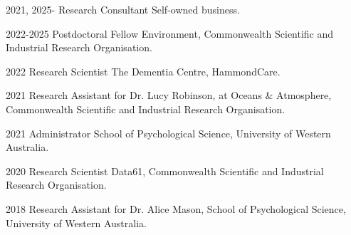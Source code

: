 

\begin{cvskills}

  \cvskill
    {2021, 2025-} %
    {Research Consultant} %
    {Self-owned business.} %

  \cvskill
    {2022-2025} %
    {Postdoctoral Fellow} %
    {Environment, Commonwealth Scientific and Industrial Research Organisation.} %

  \cvskill
    {2022} %
    {Research Scientist} %
    {The Dementia Centre, HammondCare.} %

  \cvskill
    {2021} %
    {Research Assistant} %
    {for Dr. Lucy Robinson, at Oceans \& Atmosphere, Commonwealth Scientific and Industrial Research Organisation.} %

  \cvskill
    {2021} %
    {Administrator} %
    {School of Psychological Science, University of Western Australia.} %


  \cvskill
    {2020} %
    {Research Scientist} %
    {Data61, Commonwealth Scientific and Industrial Research Organisation.} %

  \cvskill
    {2018} %
    {Research Assistant} %
    {for Dr. Alice Mason, School of Psychological Science, University of Western Australia.} %

\end{cvskills}
